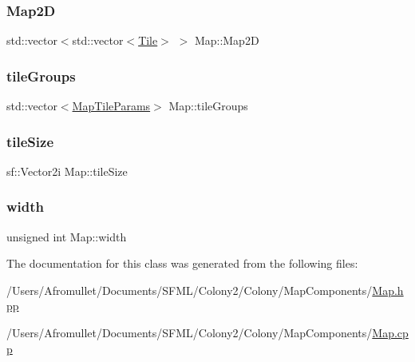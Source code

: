 \subsubsection{\texorpdfstring{Map2D}{Map2D}}
{\footnotesize\ttfamily std\+::vector$<$std\+::vector$<$\mbox{\hyperlink{class_tile}{Tile}}$>$ $>$ Map\+::\+Map2D}

\mbox{\label{class_map_a0f73f48de7a6630b79042eb7e768368b}} 
\subsubsection{\texorpdfstring{tile\+Groups}{tileGroups}}
{\footnotesize\ttfamily std\+::vector$<$\mbox{\hyperlink{_map_8hpp_a970bf0518d4d28fb59d97d608760830c}{Map\+Tile\+Params}}$>$ Map\+::tile\+Groups}

\mbox{\label{class_map_a1777f71edba289ab1e891492d651a491}} 
\subsubsection{\texorpdfstring{tile\+Size}{tileSize}}
{\footnotesize\ttfamily sf\+::\+Vector2i Map\+::tile\+Size\hspace{0.3cm}{\ttfamily [private]}}

\mbox{\label{class_map_aa510a987349c68df39475a3a217bd733}} 
\subsubsection{\texorpdfstring{width}{width}}
{\footnotesize\ttfamily unsigned int Map\+::width\hspace{0.3cm}{\ttfamily [private]}}



The documentation for this class was generated from the following files\+:\begin{DoxyCompactItemize}
\item 
/\+Users/\+Afromullet/\+Documents/\+S\+F\+M\+L/\+Colony2/\+Colony/\+Map\+Components/\mbox{\hyperlink{_map_8hpp}{Map.\+hpp}}\item 
/\+Users/\+Afromullet/\+Documents/\+S\+F\+M\+L/\+Colony2/\+Colony/\+Map\+Components/\mbox{\hyperlink{_map_8cpp}{Map.\+cpp}}\end{DoxyCompactItemize}
